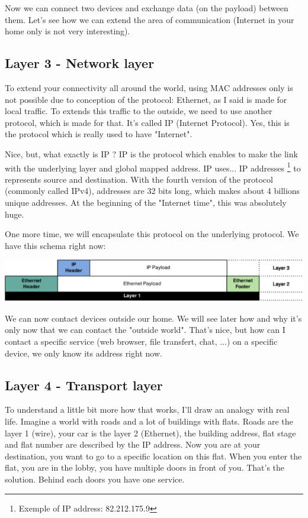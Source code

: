 \documentclass{article}
\begin{document}
	Now we can connect two devices and exchange data (on the payload) between them. Let's see how we can extend
	the area of communication (Internet in your home only is not very interesting).
	
	\subsection{Layer 3 - Network layer}
	
	To extend your connectivity all around the world, using MAC addresses only is not possible due to conception
	of the protocol: Ethernet, as I said is made for local traffic. To extends this traffic to the outside, we need
	to use another protocol, which is made for that. It's called IP (Internet Protocol). Yes, this is the protocol
	which is really used to have "Internet".
	
	Nice, but, what exactly is IP ? IP is the protocol which enables to make the link with the underlying layer
	and global mapped address. IP uses... IP addresses
	\footnote{Exemple of IP address: 82.212.175.9} to represents source and destination. With the fourth version of the protocol
	(commonly called IPv4), addresses are 32 bits long, which makes about 4 billions unique addresses. At the beginning of
	the "Internet time", this was absolutely huge.
	
	One more time, we will encapsulate this protocol on the underlying protocol. We have this schema right now:
	\begin{center}
	\includegraphics[scale=0.35]{content/layer3.eps}
	\end{center}
	
	We can now contact devices outside our home. We will see later how and why it's only now that we can contact
	the "outside world". That's nice, but how can I contact a specific service (web browser, file transfert, chat, ...)
	on a specific device, we only know its address right now.
	
	\subsection{Layer 4 - Transport layer}
	
	To understand a little bit more how that works, I'll draw an analogy with real life. Imagine a world with
	roads and a lot of buildings with flats. Roads are the layer 1 (wire), your car is the layer 2 (Ethernet), the building
	address, flat stage and flat number are described by the IP address. Now you are at your destination, you want to
	go to a specific location on this flat. When you enter the flat, you are in the lobby, you have multiple doors
	in front of you. That's the solution. Behind each doors you have one service.
	
\end{document}
